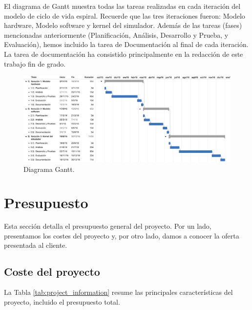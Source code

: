 El diagrama de Gantt muestra todas las tareas realizadas en cada iteración del modelo de ciclo de vida espiral. Recuerde que las tres iteraciones fueron: Modelo \gls{hardware}, Modelo \gls{software} y kernel del simulador. Además de las tareas (fases) mencionadas anteriormente (Planificación, Análisis, Desarrollo y Prueba, y Evaluación), hemos incluido la tarea de Documentación al final de cada iteración. La tarea de documentación ha consistido principalmente en la redacción de este trabajo fin de grado.

\begin{figure}[htbp]
 	\centering
 	\includegraphics[width=16.5cm]{figures/ganttFuente}
 	\caption{Diagrama Gantt.}
	\label{fig:gantt}
\end{figure}

\section{Presupuesto}
\label{sec:budget}

Esta sección detalla el presupuesto general del proyecto. Por un lado, presentamos los costes del proyecto y, por otro lado, damos a conocer la oferta presentada al cliente.

\subsection{Coste del proyecto}

La Tabla \ref{tab:project_information} resume las principales características del proyecto, incluido el presupuesto total.

